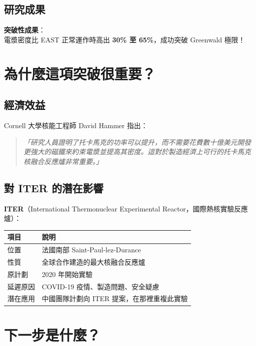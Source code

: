 \documentclass[11pt,a4paper]{article}
\begin{document}
\subsection{研究成果}

\begin{importantbox}
\textbf{突破性成果}：\\[0.3cm]
電漿密度比 EAST 正常運作時高出 \textbf{30\% 至 65\%}，成功突破 Greenwald 極限！
\end{importantbox}

\section{為什麼這項突破很重要？}

\subsection{經濟效益}

Cornell 大學核能工程師 David Hammer 指出：

\begin{quote}
\textit{「研究人員證明了托卡馬克的功率可以提升，而不需要花費數十億美元開發更強大的磁鐵來約束電漿並提高其密度。這對於製造經濟上可行的托卡馬克核融合反應爐非常重要。」}
\end{quote}

\subsection{對 ITER 的潛在影響}

\textbf{ITER}（International Thermonuclear Experimental Reactor，國際熱核實驗反應爐）：

\begin{longtable}{p{3.5cm}p{10.5cm}}
\toprule
\textbf{項目} & \textbf{說明} \\
\midrule
\endfirsthead
\bottomrule
\endfoot
位置 & 法國南部 Saint-Paul-lez-Durance \\
\midrule
性質 & 全球合作建造的最大核融合反應爐 \\
\midrule
原計劃 & 2020 年開始實驗 \\
\midrule
延遲原因 & COVID-19 疫情、製造問題、安全疑慮 \\
\midrule
潛在應用 & 中國團隊計劃向 ITER 提案，在那裡重複此實驗 \\
\bottomrule
\end{longtable}

\section{下一步是什麼？}
\end{document}
